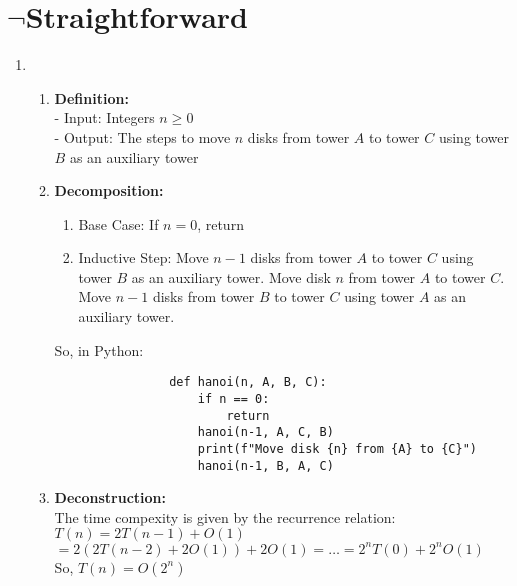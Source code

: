 \documentclass[a4paper]{article}
\begin{document}
\section{$\neg$Straightforward}
    \begin{enumerate}
        \item \begin{enumerate}
            \item \textbf{Definition:} \\
            - Input: Integers $n \ge 0$ \\
            - Output: The steps to move $n$ disks from tower $A$ to tower $C$ using tower $B$ as an auxiliary tower \\

            \item \textbf{Decomposition:} \\
            \begin{enumerate}
                \item Base Case: If $n = 0$, return \\
                \item Inductive Step: Move $n-1$ disks from tower $A$ to tower $C$ using tower $B$ as an auxiliary tower. Move disk $n$ from tower $A$ to tower $C$. Move $n-1$ disks from tower $B$ to tower $C$ using tower $A$ as an auxiliary tower. \\
            \end{enumerate}

            So, in Python:
            \lstset{language=Python}
            \begin{lstlisting}
                def hanoi(n, A, B, C):
                    if n == 0:
                        return
                    hanoi(n-1, A, C, B)
                    print(f"Move disk {n} from {A} to {C}")
                    hanoi(n-1, B, A, C)
            \end{lstlisting}

            \item \textbf{Deconstruction:} \\
            The time compexity is given by the recurrence relation: $T(n) = 2T(n-1) + O(1)$ \\
            $ = 2(2T(n-2) + 2O(1)) + 2O(1) = \dots = 2^nT(0) + 2^nO(1)$ \\
            So, $T(n) = O(2^n)$ \\


\end{enumerate}
\end{enumerate}
\end{document}
